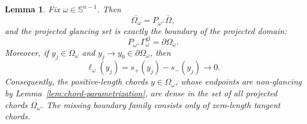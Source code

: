 \documentclass[11pt]{article}
\numberwithin{equation}{section}
\newtheorem{lemma}[theorem]{Lemma}
\newcommand{\Sn}{\mathbb S^{n-1}}
\begin{document}
\begin{lemma}\label{lem:glancing-projection-density}
Fix \(\omega\in\Sn\).  Then
\begin{equation}\label{eq:projection-closure}
    \overline{\Omega_\omega}=P_{\omega^\perp}\overline\Omega,
\end{equation}
and the projected glancing set is exactly the boundary of the projected domain:
\begin{equation}\label{eq:projected-glancing-boundary}
    P_{\omega^\perp}\Gamma_\omega^{\mathrm{gl}}
    =
    \partial\Omega_\omega .
\end{equation}
Moreover, if \(y_j\in\Omega_\omega\) and \(y_j\to y_0\in\partial\Omega_\omega\), then
\begin{equation}\label{eq:ell-to-zero-at-glancing}
    \ell_\omega(y_j)=s_+(y_j)-s_-(y_j)\longrightarrow 0 .
\end{equation}
Consequently, the positive-length chords \(y\in\Omega_\omega\), whose endpoints are non-glancing by Lemma~\ref{lem:chord-parametrization}, are dense in the set of all projected chords \(\overline{\Omega_\omega}\).  The missing boundary family consists only of zero-length tangent chords.
\end{lemma}
\end{document}
